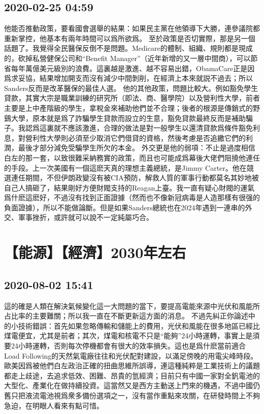 \documentclass[twocolumn]{ctexart}
\begin{document}
\subsection*{2020-02-25 04:59}

他能否推動政策，要看國會選舉的結果：如果民主黨在他領導下大勝，連參議院都重新掌控，他基本有兩年時間可以爲所欲爲。
至於政策是否切實際，那是另一個話題了。我覺得全民醫保反倒不是問題。Medicare的體制、組織、規則都是現成的，砍掉私營健保公司和“Benefit Manager”（近年新增的又一層中間商），可以節省每年萬億美元級別的浪費。這裏越是激進、越不容易出錯，ObamaCare正是因爲求妥協，結果增加開支而沒有減少中間剝削，在經濟上本來就説不過去；所以Sanders反而是改革醫保的最佳人選。
他的其他政策，問題比較大。例如豁免學生貸款，其實大宗是職業訓練的研究所（即法、商、醫學院）以及營利性大學，前者主要是上中產階級的學生，拿稅金來補助他們並不合理；後者的根源是傳銷式的野鷄大學，原本就是爲了詐騙學生貸款而設立的生意，豁免貸款最終反而是補助騙子。我認爲這裏就不應該激進，合理的做法是對一般學生以還清貸款爲條件豁免利息，對營利性大學則必須至少取消它們借貸的資格，然後考慮是否追繳它們的利潤，最後才部分減免受騙學生所欠的本金。
外交更是他的弱項：不止是過度相信白左的那一套，以致很難采納務實的政策，而且也可能成爲幕後大佬們阻撓他連任的手段。上一次美國有一個這麽天真的理想主義總統，是Jimmy Carter。他在競選連任期間，不但伊朗政變沒有被CIA預防，解救人質的軍事行動都莫名其妙地被自己人搞砸了，結果剛好方便財閥支持的Reagan上臺。我一直有疑心財閥的運氣爲什麽這麽好，不過沒有找到正面證據（然而也不像新冠病毒是人造那樣有很强的負面證據），所以不能做論斷。但是如果Sanders總統也在2024年遇到一連串的外交、軍事挫折，或許就可以說不一定純屬巧合。
\section*{【能源】【經濟】2030年左右}
\subsection*{2020-08-02 15:41}

這的確是人類在解決氣候變化這一大問題的當下，要提高電能來源中光伏和風能所占比率的主要難關；所以我一直在不斷更新這方面的消息。
不過先糾正你論述中的小技術錯誤：首先如果忽略傳輸和儲能上的費用，光伏和風能在很多地區已經比煤電便宜，尤其是前者；其次，煤電和核電不只是“能夠”24小時運轉，事實上是須要24小時運轉，否則每次停機都會有很大的效率損失。這也是爲什麽當前適合Load Following的天然氣電廠往往和光伏配對建設，以滿足傍晚的用電尖峰時段。
歐美因爲被他們白左政治正確的扭曲思維所誤導，連這種純粹是工業技術上的議題都走上歧途，去追求低效、困難、昂貴的氫經濟；目前只有中國一家對全釩電池的大型化、產業化在做持續投資。這當然又是西方主動送上門來的機遇，不過中國仍舊只把液流電池視爲衆多備份選項之一，沒有當作重點來攻關，在研發時間上不夠急迫，在明眼人看來有點可惜。
\end{document}

